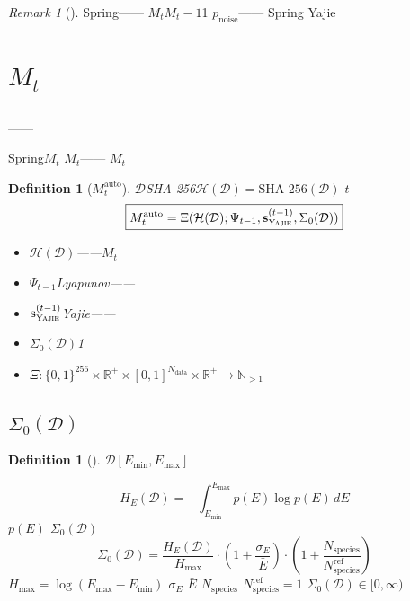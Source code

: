 \documentclass[12pt,a4paper]{article}
\newtheorem{definition}[theorem]{Definition}
\theoremstyle{remark}
\newtheorem{remark}[theorem]{Remark}
\newcommand{\R}{\mathbb{R}}
\newcommand{\N}{\mathbb{N}}
\newcommand{\D}{\mathcal{D}}
\newcommand{\Yajie}{\textsc{Yajie}}
\newcommand{\Mauto}{\ensuremath{M_t^{\text{auto}}}}
\newcommand{\Lyap}{\ensuremath{\Psi}}
\newcommand{\Dhash}{\ensuremath{\mathcal{H}(\D)}}
\begin{document}
\begin{remark}[]
Spring\textit{}——\textit{}
$M_t$$M_t - 1$1
$p_{\text{noise}}$——
Spring
Yajie\textbf{}
\end{remark}

\newpage

\section{$M_t$}

\subsection{}


\textit{}——



Spring\textbf{$M_t$}
$M_t$——
$M_t$

\begin{definition}[$\Mauto$]
$\D$SHA-256$\Dhash = \text{SHA-256}(\D)$
$t$
\begin{equation}\label{eq:Mt_definition}
    \boxed{\Mauto = \Xi(\Dhash; \Lyap_{t-1}, \mathbf{s}_{\Yajie}^{(t-1)}, \Sigma_0(\D))}
\end{equation}

\begin{itemize}[nosep]
    \item $\Dhash$——$M_t$
    \item $\Lyap_{t-1}$Lyapunov——
    \item $\mathbf{s}_{\Yajie}^{(t-1)}$Yajie——
    \item $\Sigma_0(\D)$\ref{def:data_complexity}
    \item $\Xi: \{0,1\}^{256} \times \R^+ \times [0,1]^{N_{\text{data}}} \times \R^+ \to \N_{>1}$
\end{itemize}
\end{definition}

\subsection{$\Sigma_0(\D)$}

\begin{definition}[]\label{def:data_complexity}
$\D$$[E_{\min}, E_{\max}]$

\begin{equation}
    H_E(\D) = -\int_{E_{\min}}^{E_{\max}} p(E) \log p(E) \, dE
\end{equation}
$p(E)$
$\Sigma_0(\D)$
\begin{equation}\label{eq:Sigma0_data}
    \Sigma_0(\D) = \frac{H_E(\D)}{H_{\max}} \cdot \left(1 + \frac{\sigma_E}{\bar{E}}\right) \cdot \left(1 + \frac{N_{\text{species}}}{N_{\text{species}}^{\text{ref}}}\right)
\end{equation}
$H_{\max} = \log(E_{\max} - E_{\min})$
$\sigma_E$
$\bar{E}$
$N_{\text{species}}$
$N_{\text{species}}^{\text{ref}} = 1$
$\Sigma_0(\D) \in [0, \infty)$
\end{definition}
\end{document}
